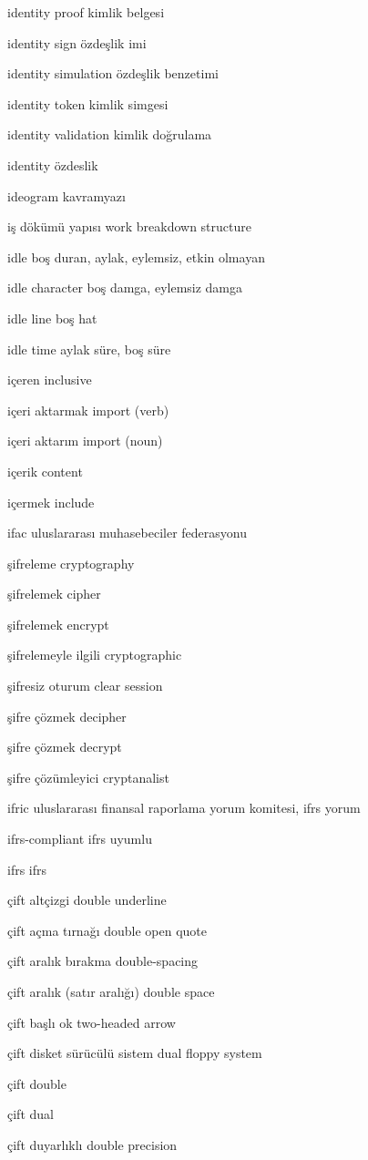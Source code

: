 \documentclass[12pt,fleqn]{article}\usepackage{../../common}
\begin{document}
identity proof kimlik belgesi

identity sign özdeşlik imi

identity simulation özdeşlik benzetimi

identity token kimlik simgesi

identity validation kimlik doğrulama

identity özdeslik

ideogram kavramyazı

iş dökümü yapısı work breakdown structure

idle boş duran, aylak, eylemsiz, etkin olmayan

idle character boş damga, eylemsiz damga

idle line boş hat

idle time aylak süre, boş süre

içeren inclusive

içeri aktarmak import (verb)

içeri aktarım import (noun)

içerik content

içermek include

ifac uluslararası muhasebeciler federasyonu

şifreleme cryptography

şifrelemek cipher

şifrelemek encrypt

şifrelemeyle ilgili cryptographic

şifresiz oturum clear session

şifre çözmek decipher

şifre çözmek decrypt

şifre çözümleyici cryptanalist

ifric uluslararası finansal raporlama yorum  komitesi, ifrs yorum

ifrs-compliant ifrs uyumlu

ifrs ifrs

çift altçizgi double underline

çift açma tırnağı double open quote

çift aralık bırakma double-spacing

çift aralık (satır aralığı) double space

çift başlı ok two-headed arrow

çift disket sürücülü sistem dual floppy system

çift double

çift dual

çift duyarlıklı double precision
\end{document}
